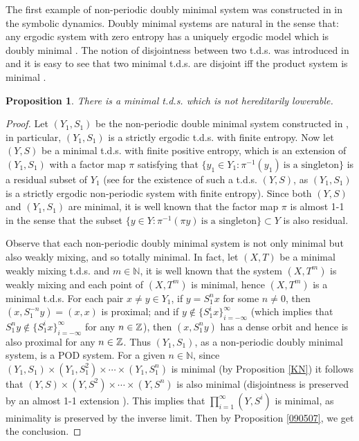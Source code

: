 \documentclass[12pt]{amsart}
\newtheorem{prop}[thm]{Proposition}
\theoremstyle{definition} \theoremstyle{question}
\numberwithin{equation}{section}
\begin{document}
The first example of non-periodic doubly minimal system was constructed in
\cite{King} in the symbolic dynamics.
Doubly minimal systems are
natural in the sense that: any ergodic system with zero entropy has
a uniquely ergodic model which is doubly minimal \cite{Weiss}.
 The
notion of disjointness between two t.d.s. was introduced in
\cite{Fu0} and it is easy to see that two minimal t.d.s. are
disjoint iff the product system is minimal \cite[Proposition 2.5]{AG}.

\medskip

\begin{prop} There is a minimal t.d.s. which is not hereditarily lowerable. \end{prop}
\begin{proof} Let $(Y_1,S_1)$ be the non-periodic double minimal system
constructed in \cite{King}, in particular, $(Y_1, S_1)$ is a
strictly ergodic t.d.s. with finite entropy.   Now let $(Y,S)$ be a
minimal t.d.s. with finite positive entropy, which is an extension
of $(Y_1, S_1)$ with a factor map $\pi$ satisfying that $\{y_1\in
Y_1: \pi^{- 1} (y_1)\ \text{is a singleton}\}$ is a residual subset
of $Y_1$ (see \cite[Theorem 3]{DL} for the existence of such a
t.d.s. $(Y,S)$, as $(Y_1, S_1)$ is a strictly ergodic non-periodic
system with finite entropy). Since both $(Y, S)$ and $(Y_1, S_1)$
are minimal, it is well known that the factor map $\pi$ is almost
1-1 in the sense that the subset $\{y\in Y: \pi^{- 1} (\pi y)\
\text{is a singleton}\}\subset Y$ is also residual.

Observe that each non-periodic doubly minimal system is not only
minimal but also weakly mixing, and so totally minimal. In fact, let
$(X, T)$ be a minimal weakly mixing t.d.s. and $m\in {\mathbb N}$, it is well
known that the system $(X, T^m)$ is weakly mixing and each point of
$(X, T^m)$ is minimal, hence $(X, T^m)$ is a minimal t.d.s. For each
pair $x\not= y\in Y_1$, if $y=S_1^nx$ for some $n\not=0$, then $(x,
S_1^{-n}y)=(x,x)$ is proximal; and if $y\not\in
\{S_1^ix\}_{i=-\infty}^\infty$ (which implies that $S_1^ny\not\in
\{S_1^ix\}_{i=-\infty}^\infty$ for any $n\in{\Bbb Z}$), then $(x,S_1^ny)$
has a dense orbit and hence is also proximal for any $n\in{\Bbb Z}$. Thus
$(Y_1, S_1)$, as a non-periodic doubly minimal system, is a POD
system. For a given $n\in{\mathbb N}$, since $(Y_1,S_1)\times
(Y_1,S_1^2)\times \cdots \times (Y_1,S_1^n)$ is minimal (by
Proposition \ref{KN}) it follows that $(Y,S)\times (Y,S^2)\times
\cdots \times (Y,S^n)$ is also minimal \cite[Proposition 2.5]{AG}
(disjointness is preserved by an almost 1-1 extension \cite[Theorem
2.6]{AG}). This implies that $\prod_{i=1}^\infty (Y,S^i)$ is
minimal, as minimality is preserved by the inverse limit. Then by
Proposition \ref{090507}, we get the conclusion.
\end{proof}
\end{document}
